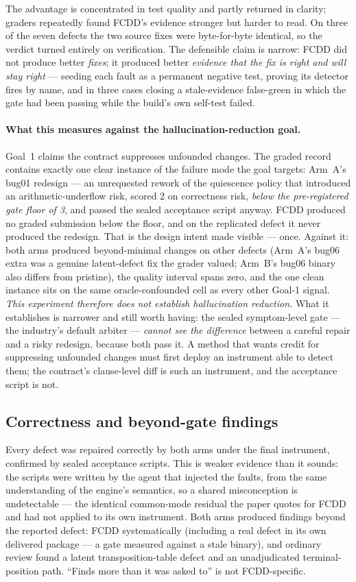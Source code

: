 \documentclass[runningheads]{llncs}
\begin{document}
The advantage is concentrated in test quality and partly returned in clarity;
graders repeatedly found FCDD's evidence stronger but harder to read. On
three of the seven defects the two source fixes were byte-for-byte identical,
so the verdict turned entirely on verification. The defensible claim is
narrow: FCDD did not produce better \emph{fixes}; it produced better
\emph{evidence that the fix is right and will stay right} --- seeding each
fault as a permanent negative test, proving its detector fires by name, and
in three cases closing a stale-evidence false-green in which the gate had
been passing while the build's own self-test failed.

\paragraph{What this measures against the hallucination-reduction goal.}
Goal~1 claims the contract suppresses unfounded changes. The graded record
contains exactly one clear instance of the failure mode the goal targets:
Arm~A's bug01 redesign --- an unrequested rework of the quiescence policy
that introduced an arithmetic-underflow risk, scored 2 on correctness risk,
\emph{below the pre-registered gate floor of 3}, and passed the sealed
acceptance script anyway. FCDD produced no graded submission below the floor,
and on the replicated defect it never produced the redesign. That is the
design intent made visible --- once. Against it: both arms produced
beyond-minimal changes on other defects (Arm~A's bug06 extra was a genuine
latent-defect fix the grader valued; Arm~B's bug06 binary also differs from
pristine), the quality interval spans zero, and the one clean instance sits
on the same oracle-confounded cell as every other Goal-1 signal. \emph{This
experiment therefore does not establish hallucination reduction.} What it
establishes is narrower and still worth having: the sealed symptom-level gate
--- the industry's default arbiter --- \emph{cannot see the difference}
between a careful repair and a risky redesign, because both pass it. A method
that wants credit for suppressing unfounded changes must first deploy an
instrument able to detect them; the contract's clause-level diff is such an
instrument, and the acceptance script is not.

\subsection{Correctness and beyond-gate findings}\label{sec:beyond}
Every defect was repaired correctly by both arms under the final instrument,
confirmed by sealed acceptance scripts. This is weaker evidence than it
sounds: the scripts were written by the agent that injected the faults, from
the same understanding of the engine's semantics, so a shared misconception
is undetectable --- the identical common-mode residual the paper quotes for
FCDD and had not applied to its own instrument. Both arms produced findings
beyond the reported defect: FCDD systematically (including a real defect in
its own delivered package --- a gate measured against a stale binary), and
ordinary review found a latent transposition-table defect and an
unadjudicated terminal-position path. ``Finds more than it was asked to'' is
not FCDD-specific.
\end{document}
